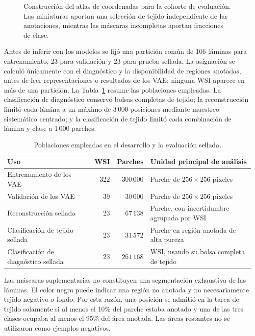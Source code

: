 \begin{figure}[htbp]
    \centering
    \resizebox{\textwidth}{!}{}
    \caption{Construcción del atlas de coordenadas para la cohorte de
    evaluación. Las miniaturas aportan una selección de tejido independiente
    de las anotaciones, mientras las máscaras incompletas aportan fracciones de
    clase.}
    \label{fig:construccion-atlas}
\end{figure}

Antes de inferir con los modelos se fijó una partición común de 106 láminas
para entrenamiento, 23 para validación y 23 para prueba sellada. La asignación
se calculó únicamente con el diagnóstico y la disponibilidad de regiones
anotadas, antes de leer representaciones o resultados de los VAE; ninguna WSI
aparece en más de una partición. La Tabla~\ref{tab:poblaciones-evaluacion}
resume las poblaciones empleadas. La clasificación de diagnóstico conservó
bolsas completas de tejido; la reconstrucción limitó cada lámina a un máximo de
\(3\,000\) posiciones mediante muestreo sistemático centrado; y la
clasificación de tejido limitó cada combinación de lámina y clase a
\(1\,000\) parches.

\begin{table}[htbp]
    \centering
    \caption{Poblaciones empleadas en el desarrollo y la evaluación sellada.}
    \label{tab:poblaciones-evaluacion}
    \small
    \begin{tabularx}{\textwidth}{@{}lrrX@{}}
        \toprule
        Uso & WSI & Parches & Unidad principal de análisis \\
        \midrule
        Entrenamiento de los VAE & 322 & \(300\,000\) & Parche de \(256\times256\) píxeles \\
        Validación de los VAE & 39 & \(30\,000\) & Parche de \(256\times256\) píxeles \\
        Reconstrucción sellada & 23 & \(67\,138\) & Parche, con incertidumbre agrupada por WSI \\
        Clasificación de tejido sellada & 23 & \(31\,572\) & Parche en región anotada de alta pureza \\
        Clasificación de diagnóstico sellada & 23 & \(261\,168\) & WSI, usando su bolsa completa de tejido \\
        \bottomrule
    \end{tabularx}
\end{table}

Las máscaras suplementarias no constituyen una segmentación exhaustiva de las
láminas. El color negro puede indicar una región no anotada y no necesariamente
tejido negativo o fondo. Por esta razón, una posición se admitió en la tarea de
tejido solamente si al menos el 10\% del parche estaba anotado y una de las
tres clases ocupaba al menos el 95\% del área anotada. Las áreas restantes no
se utilizaron como ejemplos negativos.

